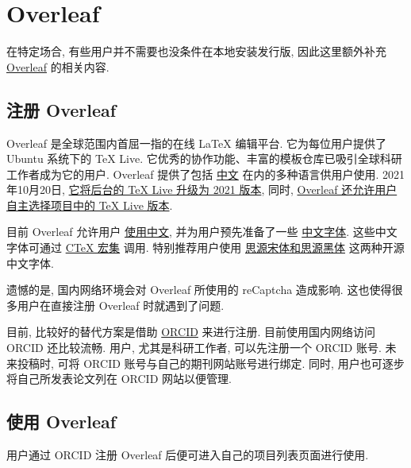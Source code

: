 
\chapter{Overleaf}

在特定场合,
有些用户并不需要也没条件在本地安装发行版,
因此这里额外补充 \href{www.overleaf.com}{Overleaf} 的相关内容.

\section{注册 Overleaf}

Overleaf 是全球范围内首屈一指的在线 \LaTeX{} 编辑平台.
它为每位用户提供了 Ubuntu 系统下的 \TeX{} Live.
它优秀的协作功能、丰富的模板仓库已吸引全球科研工作者成为它的用户.
Overleaf 提供了包括%
\href{https://cn.overleaf.com}{中文}%
在内的多种语言供用户使用.
2021年10月20日,
\href{https://www.overleaf.com/blog/tex-live-2021-now-available}{它将后台的 \TeX{} Live 升级为 2021 版本},
同时,
\href{https://www.overleaf.com/blog/new-feature-select-your-tex-live-compiler-version}{Overleaf 还允许用户自主选择项目中的 \TeX{} Live 版本}.

目前 Overleaf 允许用户%
\href{https://www.overleaf.com/learn/latex/Chinese}{使用中文},
并为用户预先准备了一些%
\href{https://www.overleaf.com/learn/latex/Questions/What_OTF/TTF_fonts_are_supported_via_fontspec%3F#Fonts_for_CJK}{中文字体}.
这些中文字体可通过%
\href{https://www.overleaf.com/latex/templates/using-the-ctex-package-on-overleaf-zai-overleafping-tai-shang-shi-yong-ctex/gndvpvsmjcqx}{C\TeX{} 宏集}%
调用.
特别推荐用户使用%
\href{https://www.overleaf.com/latex/examples/demonstration-of-noto-serif-cjk-and-noto-sans-cjk-fonts/sgrwgcddtqsq}{思源宋体和思源黑体}%
这两种开源中文字体.


遗憾的是,
国内网络环境会对 Overleaf 所使用的 reCaptcha 造成影响.
这也使得很多用户在直接注册 Overleaf 时就遇到了问题.

目前,
比较好的替代方案是借助 \href{https://orcid.org}{ORCID} 来进行注册.
目前使用国内网络访问 ORCID 还比较流畅.
用户, 尤其是科研工作者, 可以先注册一个 ORCID 账号.
未来投稿时,
可将 ORCID 账号与自己的期刊网站账号进行绑定.
同时,
用户也可逐步将自己所发表论文列在 ORCID 网站以便管理.

\section{使用 Overleaf}

用户通过 ORCID 注册 Overleaf 后便可进入自己的项目列表页面进行使用.


